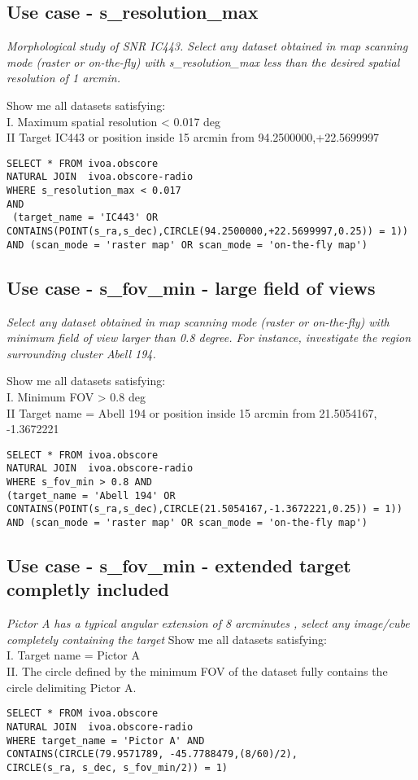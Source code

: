 \subsection{Use case - s\_resolution\_max}
\label{sec:s_resolution_max}
\textit{Morphological study of SNR IC443. Select any dataset obtained in map scanning mode (raster or on-the-fly) with s\_resolution\_max less than the desired spatial resolution of 1 arcmin.}

Show me all datasets satisfying: \\
I. Maximum spatial resolution < 0.017 deg \\
II Target IC443 or position inside 15 arcmin from 94.2500000,+22.5699997 \\

\begin{verbatim}
SELECT * FROM ivoa.obscore
NATURAL JOIN  ivoa.obscore-radio 
WHERE s_resolution_max < 0.017 
AND
 (target_name = 'IC443' OR
CONTAINS(POINT(s_ra,s_dec),CIRCLE(94.2500000,+22.5699997,0.25)) = 1)) 
AND (scan_mode = 'raster map' OR scan_mode = 'on-the-fly map')
\end{verbatim}

\subsection{Use case - s\_fov\_min - large field of views}
\label{sec:s_fov_min}
\textit{Select any dataset obtained in map scanning mode (raster or on-the-fly) with minimum field of view larger than 0.8 degree. For instance, investigate the region surrounding cluster Abell 194.}

Show me all datasets satisfying:\\
I. Minimum FOV > 0.8 deg \\
II Target name = Abell 194 or position inside 15 arcmin from 21.5054167, -1.3672221 \\
\begin{verbatim}
SELECT * FROM ivoa.obscore
NATURAL JOIN  ivoa.obscore-radio 
WHERE s_fov_min > 0.8 AND
(target_name = 'Abell 194' OR
CONTAINS(POINT(s_ra,s_dec),CIRCLE(21.5054167,-1.3672221,0.25)) = 1)) 
AND (scan_mode = 'raster map' OR scan_mode = 'on-the-fly map')
\end{verbatim}

\subsection{Use case - s\_fov\_min - extended target completly included}
\label{sec:s_fov_max}
\textit{Pictor A has a typical angular extension  of 8 arcminutes , select any image/cube completely containing the target}
Show me all datasets satisfying: \\
I. Target name = Pictor A \\
II. The circle defined by the minimum FOV of the dataset fully contains the circle delimiting Pictor A. \\
\begin{verbatim}
SELECT * FROM ivoa.obscore
NATURAL JOIN  ivoa.obscore-radio 
WHERE target_name = 'Pictor A' AND
CONTAINS(CIRCLE(79.9571789, -45.7788479,(8/60)/2),
CIRCLE(s_ra, s_dec, s_fov_min/2)) = 1)
\end{verbatim}

